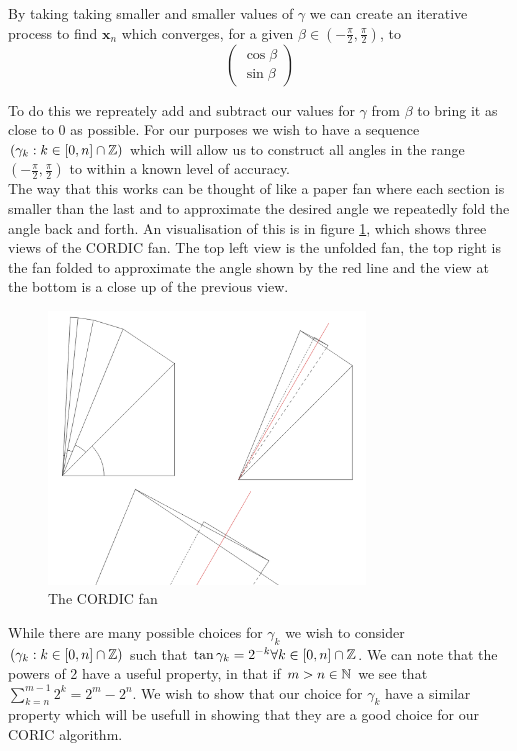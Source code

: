 {By taking taking smaller and smaller values of $\gamma$ we can create an iterative process to find $\mathbf{x}_n$ which converges, for a given $\beta \in (-\frac{\pi}{2}, \frac{\pi}{2})$, to
\begin{displaymath}
	\left( \begin{array}{c}
		\cos{\beta}\\
		\sin{\beta}
	\end{array} \right)
\end{displaymath}

To do this we repreately add and subtract our values for \(\gamma\) from \(\beta\) to bring it as close to 0 as possible. For our purposes we wish to have a sequence \((\gamma_k : k \in [0, n] \cap \mathbb{Z})\) which will allow us to construct all angles in the range \((-\frac{\pi}{2}, \frac{\pi}{2})\) to within a known level of accuracy. \\

The way that this works can be thought of like a paper fan where each section is smaller than the last and to approximate the desired angle we repeatedly fold the angle back and forth. An visualisation of this is in figure \ref{FIG_"Fan Diagram"}, which shows three views of the CORDIC fan. The top left view is the unfolded fan, the top right is the fan folded to approximate the angle shown by the red line and the view at the bottom is a close up of the previous view.

\begin{figure}[!ht]
	\label{FIG_"Fan Diagram"}
	\caption{The CORDIC fan}
	\centering
	\includegraphics[width=0.75\textwidth]{"./Diagrams/Fan Diagram"}
\end{figure}

While there are many possible choices for \(\gamma_k\) we wish to consider \((\gamma_k : k \in [0, n] \cap \mathbb{Z})\) such that \(\tan \gamma_k = 2^{-k} \forall k \in [0,n] \cap \mathbb{Z}\). We can note that the powers of 2 have a useful property, in that if \(m > n \in \mathbb{N}\) we see that \(\sum_{k=n}^{m-1} 2^k = 2^m - 2^n\). We wish to show that our choice for \(\gamma_k\) have a similar property which will be usefull in showing that they are a good choice for our CORIC algorithm.

}

